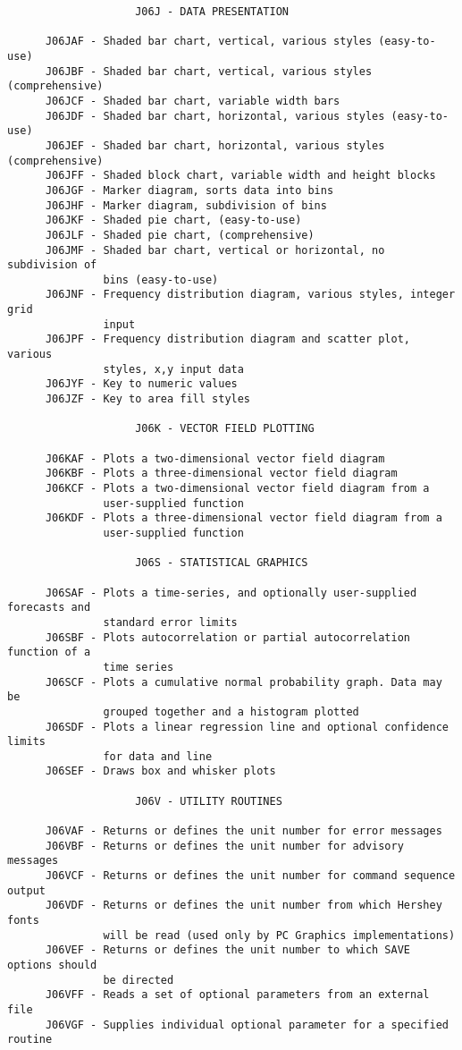 \begin{verbatim}
                    J06J - DATA PRESENTATION
 
      J06JAF - Shaded bar chart, vertical, various styles (easy-to-use)
      J06JBF - Shaded bar chart, vertical, various styles (comprehensive)
      J06JCF - Shaded bar chart, variable width bars
      J06JDF - Shaded bar chart, horizontal, various styles (easy-to-use)
      J06JEF - Shaded bar chart, horizontal, various styles (comprehensive)
      J06JFF - Shaded block chart, variable width and height blocks
      J06JGF - Marker diagram, sorts data into bins
      J06JHF - Marker diagram, subdivision of bins
      J06JKF - Shaded pie chart, (easy-to-use)
      J06JLF - Shaded pie chart, (comprehensive)
      J06JMF - Shaded bar chart, vertical or horizontal, no subdivision of
               bins (easy-to-use)
      J06JNF - Frequency distribution diagram, various styles, integer grid
               input
      J06JPF - Frequency distribution diagram and scatter plot, various
               styles, x,y input data
      J06JYF - Key to numeric values
      J06JZF - Key to area fill styles
 
                    J06K - VECTOR FIELD PLOTTING
 
      J06KAF - Plots a two-dimensional vector field diagram
      J06KBF - Plots a three-dimensional vector field diagram
      J06KCF - Plots a two-dimensional vector field diagram from a
               user-supplied function
      J06KDF - Plots a three-dimensional vector field diagram from a
               user-supplied function
 
                    J06S - STATISTICAL GRAPHICS
 
      J06SAF - Plots a time-series, and optionally user-supplied forecasts and
               standard error limits
      J06SBF - Plots autocorrelation or partial autocorrelation function of a
               time series
      J06SCF - Plots a cumulative normal probability graph. Data may be
               grouped together and a histogram plotted
      J06SDF - Plots a linear regression line and optional confidence limits
               for data and line
      J06SEF - Draws box and whisker plots
 
                    J06V - UTILITY ROUTINES
 
      J06VAF - Returns or defines the unit number for error messages
      J06VBF - Returns or defines the unit number for advisory messages
      J06VCF - Returns or defines the unit number for command sequence output
      J06VDF - Returns or defines the unit number from which Hershey fonts
               will be read (used only by PC Graphics implementations)
      J06VEF - Returns or defines the unit number to which SAVE options should
               be directed
      J06VFF - Reads a set of optional parameters from an external file
      J06VGF - Supplies individual optional parameter for a specified routine
\end{verbatim}
